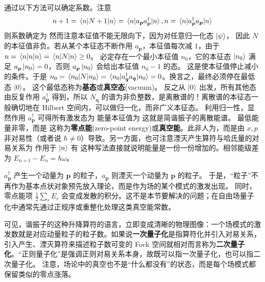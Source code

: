 通过以下方法可以确定系数。注意
\[
    n + 1 = \mel{n}{N+1}{n} = \mel{n}{a_{\bm p}a^\dagger_{\bm p}}{n},n=\mel{n}{a^\dagger_{\bm p} a_{\bm p}}{n}
\]
则系数确定为
然而注意本征值不能无限向下，因为对任意归一化态 $\ket\psi$，
因此 $N$ 的本征值非负。若从某个本征态不断作用 $a_{\bm p}$，本征值每次减 $1$，由于 $n=\ev{n}{n}=\ev{N}{n}\geq 0$。
必定存在一个最小本征值 $n_0$，它的本征态 $\ket{n_0}$ 满足 $a_{\bm p}\ket{n_0}=0$，否则 $a_{\bm p}\ket{n_0}$ 会给出本征值 $n_0-1$ 的态。
这是使本征值停止减小的条件。于是 $n_0=\ev{N}{n_0}=\ev{a^\dagger_{\bm q} a_{\bm q}}{n_0}=0$。换言之，最终必须停在最低态 $\ket0$。
这个最低态称为\textbf{基态}或\textbf{真空态}(vacuum)。
反之从 $\ket0$ 出发，所有其他态由反复作用 $a^\dagger_{\bm p}$ 得到，所以 $N_{\bm q}$ 的谱为非负整数，是离散谱的！离散谱的本征态一般确切地在 Hilbert 空间内，可以做归一化，而非广义本征态。
利用归一性，显然作用 $a^\dagger_{\bm p}$ 可得所有激发态为
能量本征值为
这就是简谐振子的离散能谱。
最低能量非零，而是
这称为\textbf{零点能}(zero-point energy)或\textbf{真空能}。此非人为，而是由 $x,p$ 非对易性（或者说 $\hbar\ne 0$）导致。另一方面，也可注意湮灭产生算符与哈氏量的对易关系为
作用于 $\ket n$ 有
这种写法直接就说明能量是一份一份增加的。相邻能级差为 $E_{n+1}-E_n=\hbar\omega$。

$a_{\bm p}^\dagger$ 产生一个动量为 $\bm p$ 的粒子，$a_{\bm p}$ 则湮灭一个动量为 $\bm p$ 的粒子。
于是，“粒子”不再作为基本点状对象预先放入理论，而是作为场的某个模式的激发出现。
同时，零点能项 $\frac{1}{2}\sum_r E_r$ 会变成发散的积分。这不是本节要解决的问题；在自由场量子化中通常先通过正规序或重整化处理这类真空能常数。


可见，谐振子的这种升降算符的语言，立即变成清晰的物理图像：一个场模式的激发数就是对应动量粒子的粒子数。如果说\textbf{一次量子化}是指算符化并引入对易关系，引入产生、湮灭算符来描述粒子数可变的 Fock 空间就相对而言称为\textbf{二次量子化}。“正则量子化”是强调正则对易关系本身，故既可以指一次量子化，也可以指二次量子化。
注意，场论中的真空也不是“什么都没有”的状态，而是每个场模式都保留类似的零点涨落。

